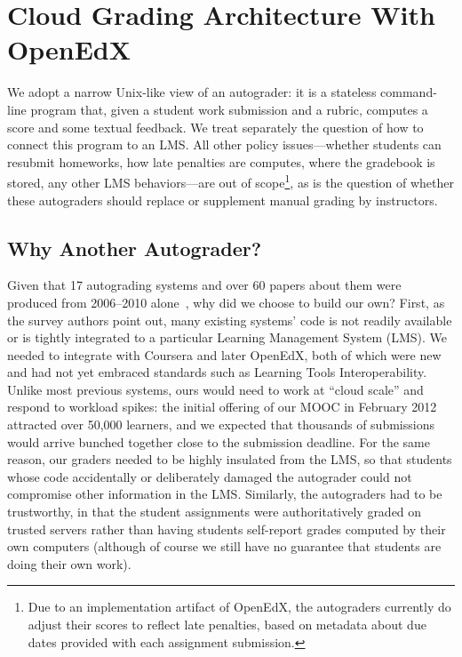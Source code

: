 \section{Cloud Grading Architecture With OpenEdX}
\label{sec:arch}



We adopt a narrow Unix-like view of an autograder: it is a
stateless command-line program that, given a student work submission and
a rubric, computes a score and some textual feedback.  We treat
separately the question of how to connect this program to an LMS.
All other policy issues---whether students can resubmit homeworks, how
late penalties are computes, where the gradebook is stored, any other
LMS behaviors---are out of scope\footnote{Due to an implementation
  artifact of OpenEdX, the autograders currently do adjust their scores
  to reflect late penalties, based on metadata about due dates provided
  with each assignment submission.}, as is the question of whether these
autograders should replace or supplement manual grading by instructors.

\subsection{Why Another Autograder?}

Given that 17 autograding systems and over 60 papers about them were
produced from 2006--2010 alone~\cite{ihantola-2010-autograding-survey},
why did we choose to build our own?
First, as the survey authors point
out, many existing systems' code
is not readily available or is tightly integrated to a particular Learning
Management System (LMS).  We needed to integrate with Coursera and
later OpenEdX, both of which were new and had not yet embraced
standards such as Learning Tools Interoperability.
Unlike most previous 
systems, ours would need to work at ``cloud scale'' and respond to
workload spikes: the initial
offering of our MOOC in February 2012  
attracted over 50,000 learners, and we expected
that thousands of submissions would arrive bunched together close to the
submission deadline.  For the same reason, our graders needed to be
highly insulated from the LMS, so that students whose code accidentally
or deliberately damaged the autograder could not compromise other
information in the LMS.
Similarly, 
the autograders had to be trustworthy, in that the student
assignments were authoritatively graded on trusted servers rather than
having students self-report grades computed by their own computers
(although of course we still have no guarantee that students are doing
their own work).


